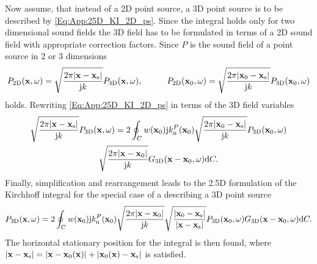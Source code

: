 Now assume, that instead of a 2D point source, a 3D point source is to be described by \eqref{Eq:App:25D_KI_2D_ps}.
Since the integral holds only for two dimensional sound fields the 3D field has to be formulated in terms of a 2D sound field with appropriate correction factors.
Since $P$ is the sound field of a point source in 2 or 3 dimensions
\begin{equation}
P_{2\text{D}}(\mathbf{x},\omega) = \sqrt{\frac{2 \pi |\mathbf{x}-\mathbf{x}_{\mathrm{s}}|}{\mathrm{j} k }} P_{3\text{D}}(\mathbf{x},\omega), \hspace{1cm}
P_{2\text{D}}(\mathbf{x}_0,\omega) = \sqrt{\frac{2 \pi |\mathbf{x}_0-\mathbf{x}_{\mathrm{s}}|}{\mathrm{j} k }} P_{3\text{D}}(\mathbf{x}_0,\omega)
\end{equation} 
holds.
Rewriting \eqref{Eq:App:25D_KI_2D_ps} in terms of the 3D field variables
\begin{multline}
\sqrt{\frac{2 \pi |\mathbf{x}-\mathbf{x}_{\mathrm{s}}|}{\mathrm{j} k }} P_{3\text{D}}(\mathbf{x},\omega) = 2 \oint_C w(\mathbf{x}_0) \mathrm{j} k_{\mathrm{n}}^P(\mathbf{x}_0) \sqrt{\frac{2 \pi |\mathbf{x}_0-\mathbf{x}_{\mathrm{s}}|}{\mathrm{j} k }} P_{3\text{D}}(\mathbf{x}_0,\omega) \\
  \sqrt{\frac{2 \pi |\mathbf{x}-\mathbf{x}_0|}{\mathrm{j} k }}G_{3\text{D}}(\mathbf{x}-\mathbf{x}_0,\omega) \mathrm{d} C.
\end{multline}
Finally, simplification and rearrangement leads to the 2.5D formulation of the Kirchhoff integral for the special case of a describing a 3D point source
\begin{equation}
P_{3\text{D}}(\mathbf{x},\omega) = 2 \oint_C w(\mathbf{x}_0) \mathrm{j} k_{\mathrm{n}}^P(\mathbf{x}_0) \sqrt{\frac{2 \pi |\mathbf{x}-\mathbf{x}_0|}{\mathrm{j} k }} \sqrt{ \frac{|\mathbf{x}_0-\mathbf{x}_{\mathrm{s}}|}{|\mathbf{x}-\mathbf{x}_{\mathrm{s}}|}} P_{3\text{D}}(\mathbf{x}_0,\omega) 
 G_{3\text{D}}(\mathbf{x}-\mathbf{x}_0,\omega) \mathrm{d} C.
\end{equation}
The horizontal stationary position for the integral is then found, where $|\mathbf{x}-\mathbf{x}_{\mathrm{s}}| = |\mathbf{x} - \mathbf{x}_0(\mathbf{x})| + |\mathbf{x}_0(\mathbf{x})-\mathbf{x}_{\mathrm{s}}|$ is satisfied.
